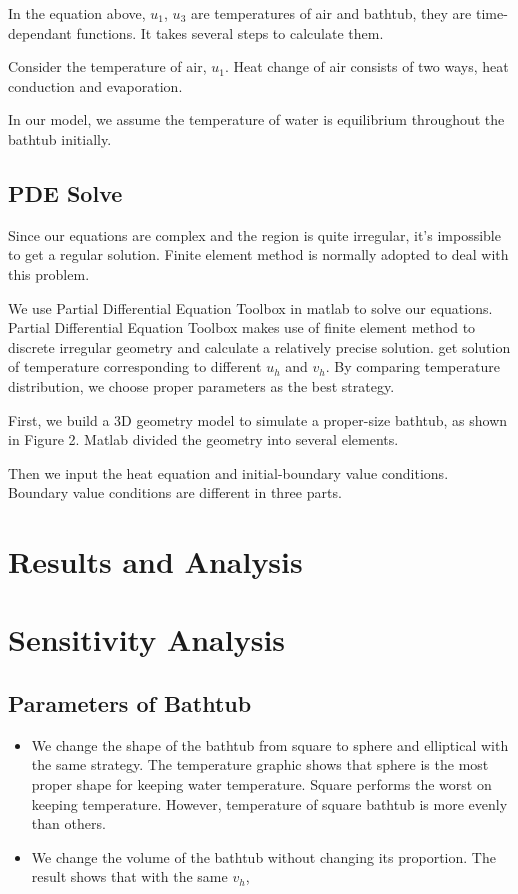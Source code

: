\documentclass[12pt,a4paper,titlepage]{article}
\begin{document}
In the equation above, $u_1$, $u_3$ are temperatures of air and bathtub, they are time-dependant functions. It takes several steps to calculate them.

Consider the temperature of air, $u_1$. Heat change of air consists of two ways, heat conduction and evaporation.

In our model, we assume the temperature of water is equilibrium throughout the bathtub initially.

\subsection{PDE Solve}
\label{sec:PDE solve}
Since our equations are complex and the region is quite irregular, it's impossible to get a regular solution. Finite element method is normally adopted to deal with this problem.

We use Partial Differential Equation Toolbox in matlab to solve our equations. Partial Differential Equation Toolbox makes use of finite element method to discrete irregular geometry and calculate a relatively precise solution. get solution of temperature corresponding to different $u_h$ and $v_h$. By comparing temperature distribution, we choose proper parameters as the best strategy.

First, we build a 3D geometry model to simulate a proper-size bathtub, as shown in Figure 2. Matlab divided the geometry into several elements.

Then we input the heat equation and initial-boundary value conditions. Boundary value conditions are different in three parts.

\section{Results and Analysis}
\label{sec:performance-and-analysis}



\section{Sensitivity Analysis}
\label{sec:sensitivity-analysis}

\subsection{Parameters of Bathtub}
\label{sec:parameters of bathtub}
\begin{itemize}
\item We change the shape of the bathtub from square to sphere and elliptical with the same strategy. The temperature graphic shows that sphere is the most proper shape for keeping water temperature. Square performs the worst on keeping temperature. However, temperature of square bathtub is more evenly than others.
\item We change the volume of the bathtub without changing its proportion. The result shows that with the same $v_h$, 
\end{itemize}
\end{document}
